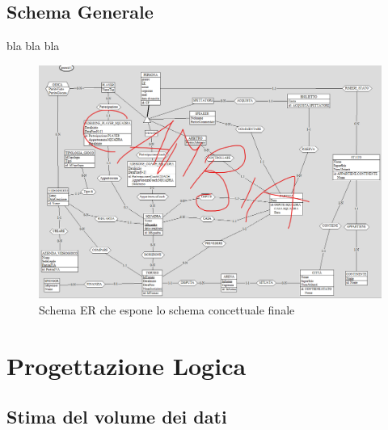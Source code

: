 \documentclass[a4paper,12pt]{report}
\begin{document}
\section{Schema Generale}
bla bla bla
\begin{figure}[!htb]
	\centerline{\includegraphics[scale=0.6]{img/ER_Generale.png}}
	\caption{Schema ER che espone lo schema concettuale finale}
	\label{img:ER_Generale}
\end{figure}

\chapter{Progettazione Logica}
\section{Stima del volume dei dati}
\renewcommand{\arraystretch}{1.5} %
\setlength{\arrayrulewidth}{0.5mm}%
\setlength{\tabcolsep}{10pt}%
\setlength\doublerulesep{0.31cm}%
\end{document}
